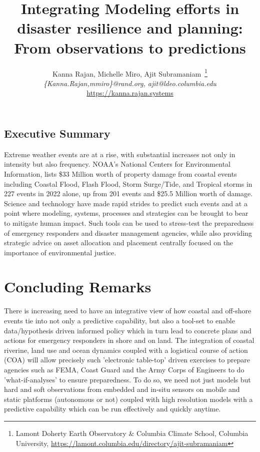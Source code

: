 \documentclass[11pt,letterpaper]{article}
\title{\Large{Integrating Modeling efforts in disaster resilience and planning:\\
    From observations to predictions}}
\author{\normalsize{Kanna Rajan, Michelle Miro, Ajit
      Subramaniam~\footnote{Lamont Doherty Earth Observatory \&
        Columbia Climate School, \newline Columbia University,
        \url{https://lamont.columbia.edu/directory/ajit-subramaniam}}
    }\\
  \emph{\{Kanna.Rajan,mmiro\}@rand.org, ajit@ldeo.columbia.edu}\\
  \url{https://kanna.rajan.systems}}
\begin{document}
\maketitle{}

\subsection*{Executive Summary}

Extreme weather events are at a rise, with substantial increases not
only in intensity but also frequency. NOAA's National Centers for
Environmental Information, lists \$33 Million worth of property damage
from coastal events including Coastal Flood, Flash Flood, Storm
Surge/Tide, and Tropical storms in 227 events in 2022 alone, up from
201 events and \$25.5 Million worth of damage. Science and technology
have made rapid strides to predict such events and at a point where
modeling, systems, processes and strategies can be brought to bear to
mitigate human impact. Such tools can be used to stress-test the
preparedness of emergency responders and disaster management agencies,
while also providing strategic advice on asset allocation and
placement centrally focused on the importance of environmental
justice. 






% 


\section*{Concluding Remarks}

There is increasing need to have an integrative view of how coastal
and off-shore events tie into not only a predictive capability, but
also a tool-set to enable data/hypothesis driven informed policy which
in turn lead to concrete plans and actions for emergency responders in
shore and on land. The integration of coastal riverine, land use and
ocean dynamics coupled with a logistical course of action (COA) will
allow precisely such 'electronic table-top' driven exercises to
prepare agencies such as FEMA, Coast Guard and the Army Corps of
Engineers to do 'what-if-analyses' to ensure preparedness. To do so,
we need not just models but hard and soft observations from embedded
and in-situ sensors on mobile and static platforms (autonomous or not)
coupled with high resolution models with a predictive capability which
can be run effectively and quickly anytime. 

% 
\end{document}
